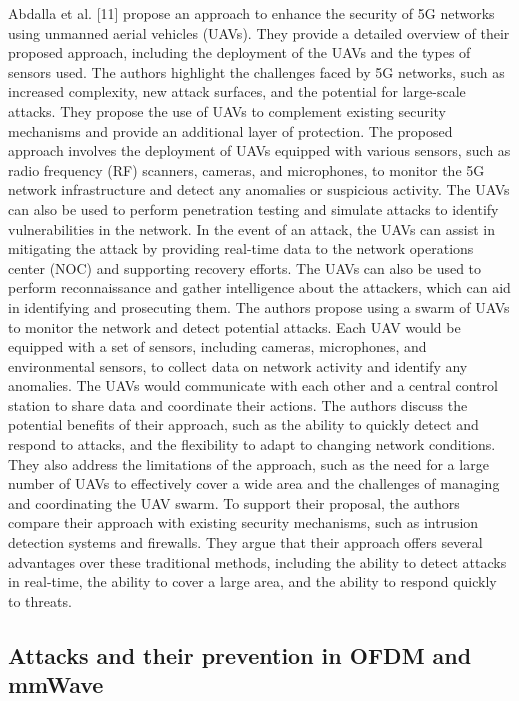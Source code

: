 \documentclass[conference]{IEEEtran}
\begin{document}
Abdalla et al. [11] propose an approach to enhance the security of 5G networks using unmanned aerial vehicles (UAVs). They provide a detailed overview of their proposed approach, including the deployment of the UAVs and the types of sensors used.
The authors highlight the challenges faced by 5G networks, such as increased complexity, new attack surfaces, and the potential for large-scale attacks. They propose the use of UAVs to complement existing security mechanisms and provide an additional layer of protection. The proposed approach involves the deployment of UAVs equipped with various sensors, such as radio frequency (RF) scanners, cameras, and microphones, to monitor the 5G network infrastructure and detect any anomalies or suspicious activity. The UAVs can also be used to perform penetration testing and simulate attacks to identify vulnerabilities in the network.
In the event of an attack, the UAVs can assist in mitigating the attack by providing real-time data to the network operations center (NOC) and supporting recovery efforts. The UAVs can also be used to perform reconnaissance and gather intelligence about the attackers, which can aid in identifying and prosecuting them. The authors propose using a swarm of UAVs to monitor the network and detect potential attacks. Each UAV would be equipped with a set of sensors, including cameras, microphones, and environmental sensors, to collect data on network activity and identify any anomalies. The UAVs would communicate with each other and a central control station to share data and coordinate their actions.
The authors discuss the potential benefits of their approach, such as the ability to quickly detect and respond to attacks, and the flexibility to adapt to changing network conditions. They also address the limitations of the approach, such as the need for a large number of UAVs to effectively cover a wide area and the challenges of managing and coordinating the UAV swarm. To support their proposal, the authors compare their approach with existing security mechanisms, such as intrusion detection systems and firewalls. They argue that their approach offers several advantages over these traditional methods, including the ability to detect attacks in real-time, the ability to cover a large area, and the ability to respond quickly to threats.

\subsection{Attacks and their prevention in OFDM and mmWave}
\end{document}
